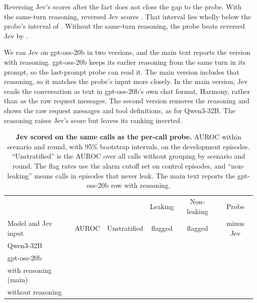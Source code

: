 Reversing Jev's scores after the fact does not close the gap to the probe.
With the same-turn reasoning, reversed Jev scores \gptossCallJevReversed{} \gptossCallJevReversedCI{}.
That interval lies wholly below the probe's interval of \gptossCallProbeCI{}.
Without the same-turn reasoning, the probe beats reversed Jev by \gptossCallProbeMinusJevNoReasoningReversed{} \gptossCallProbeMinusJevNoReasoningReversedCI{}.

We ran Jev on gpt-oss-20b in two versions, and the main text reports the version with reasoning.
gpt-oss-20b keeps its earlier reasoning from the same turn in its prompt, so the last-prompt probe can read it.
The main version includes that reasoning, so it matches the probe's input more closely.
In the main version, Jev reads the conversation as text in gpt-oss-20b's own chat format, Harmony, rather than as the raw request messages.
The second version removes the reasoning and shows the raw request messages and tool definitions, as for Qwen3-32B.
The reasoning raises Jev's score but leaves its ranking inverted.

\begin{table}[h]
  \centering
  \small
  \begin{tabular}{@{}lccccc@{}}
    \toprule
    & & & Leaking & Non-leaking & Probe \\
    Model and Jev input & AUROC & Unstratified & flagged & flagged & minus Jev \\
    \midrule
    Qwen3-32B & \qwenCallJev{} \qwenCallJevCI{} & \qwenCallJevUnstratified{} & \qwenCallJevLeakFlagged{} & \qwenCallJevRefusingFlagged{} & \qwenCallProbeMinusJev{} \qwenCallProbeMinusJevCI{} \\
    gpt-oss-20b & & & & & \\
    \quad with reasoning (main) & \gptossCallJev{} \gptossCallJevCI{} & \gptossCallJevUnstratified{} & \gptossCallJevLeakFlagged{} & \gptossCallJevRefusingFlagged{} & \gptossCallProbeMinusJev{} \gptossCallProbeMinusJevCI{} \\
    \quad without reasoning & \gptossCallJevNoReasoning{} \gptossCallJevNoReasoningCI{} & \gptossCallJevNoReasoningUnstratified{} & \gptossCallJevNoReasoningLeakFlagged{} & \gptossCallJevNoReasoningRefusingFlagged{} & \gptossCallProbeMinusJevNoReasoning{} \gptossCallProbeMinusJevNoReasoningCI{} \\
    \bottomrule
  \end{tabular}
  \caption{\textbf{Jev scored on the same calls as the per-call probe.} AUROC within scenario and round, with 95\% bootstrap intervals, on the development episodes. ``Unstratified'' is the AUROC over all calls without grouping by scenario and round. The flag rates use the alarm cutoff set on control episodes, and ``non-leaking'' means calls in episodes that never leak. The main text reports the gpt-oss-20b row with reasoning.}
  \label{tab:monitor-percall}
\end{table}
